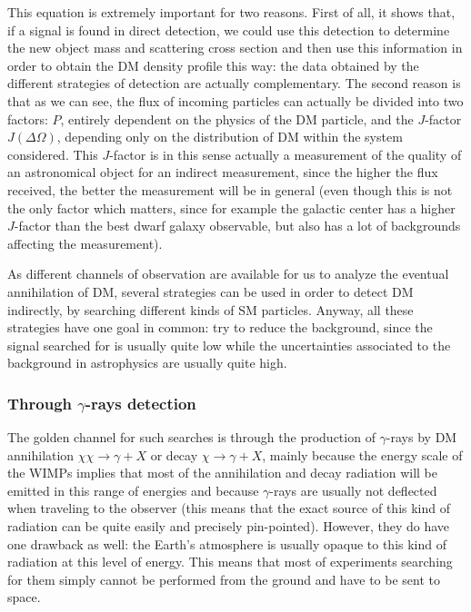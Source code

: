 \documentclass[a4paper, 10pt, openright]{report}
\begin{document}
This equation is extremely important for two reasons. First of all, it shows that, if a signal is found in direct detection, we could use this detection to determine the new object mass and scattering cross section and then use this information in order to obtain the \ac{DM} density profile this way: the data obtained by the different strategies of detection are actually complementary. The second reason is that as we can see, the flux of incoming particles can actually be divided into two factors: $P$, entirely dependent on the physics of the \ac{DM} particle, and the $J$-factor $J(\Delta \Omega)$, depending only on the distribution of \ac{DM} within the system considered. This $J$-factor is in this sense actually a measurement of the quality of an astronomical object for an indirect measurement, since the higher the flux received, the better the measurement will be in general (even though this is not the only factor which matters, since for example the galactic center has a higher $J$-factor than the best dwarf galaxy observable, but also has a lot of backgrounds affecting the measurement).

As different channels of observation are available for us to analyze the eventual annihilation of \ac{DM}, several strategies can be used in order to detect \ac{DM} indirectly, by searching different kinds of \ac{SM} particles. Anyway, all these strategies have one goal in common: try to reduce the background, since the signal searched for is usually quite low while the uncertainties associated to the background in astrophysics are usually quite high.

\subsubsection*{Through $\gamma$-rays detection}
The golden channel for such searches is through the production of $\gamma$-rays by \ac{DM} annihilation $\chi \chi \rightarrow \gamma + X$ or decay $\chi \rightarrow \gamma + X$, mainly because the energy scale of the \acp{WIMP} implies that most of the annihilation and decay radiation will be emitted in this range of energies and because $\gamma$-rays are usually not deflected when traveling to the observer (this means that the exact source of this kind of radiation can be quite easily and precisely pin-pointed). However, they do have one drawback as well: the Earth's atmosphere is usually opaque to this kind of radiation at this level of energy. This means that most of experiments searching for them simply cannot be performed from the ground and have to be sent to space. 
\end{document}

